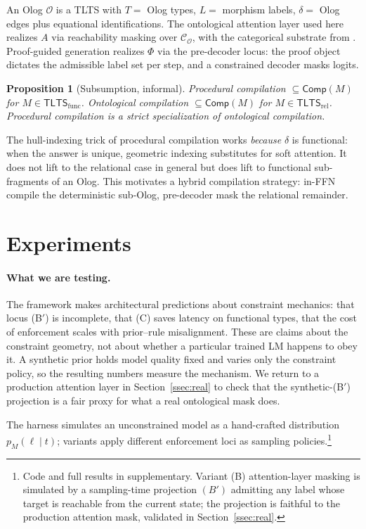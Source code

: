 \documentclass[preprint]{nesy2026}
\newtheorem{prop}{Proposition}
\begin{document}
An Olog $\mathcal{O}$ is a TLTS with $T = $ Olog types, $L = $
morphism labels, $\delta = $ Olog edges plus equational
identifications. The ontological attention layer used here
\citep{constrained_decoding} realizes $A$ via reachability masking
over $\mathcal{C}_\mathcal{O}$, with the categorical substrate from
\citet{spivakkent2012ologs}. Proof-guided generation
\citep{constrained_decoding} realizes $\Phi$ via the pre-decoder
locus: the proof object dictates the admissible label set per step,
and a constrained decoder masks logits.

\begin{prop}[Subsumption, informal]
Procedural compilation $\subseteq \mathsf{Comp}(M)$ for $M \in
\mathsf{TLTS}_{\mathrm{func}}$. Ontological compilation $\subseteq
\mathsf{Comp}(M)$ for $M \in \mathsf{TLTS}_{\mathrm{rel}}$.
Procedural compilation is a strict specialization of ontological
compilation.
\end{prop}

The hull-indexing trick of procedural compilation works \emph{because}
$\delta$ is functional: when the answer is unique, geometric indexing
substitutes for soft attention. It does not lift to the relational
case in general but does lift to functional sub-fragments of an
Olog. This motivates a hybrid compilation strategy: in-FFN compile
the deterministic sub-Olog, pre-decoder mask the relational
remainder.

\section{Experiments}
\label{sec:expts}

\paragraph{What we are testing.} The framework makes architectural
predictions about constraint mechanics: that locus (B$'$) is
incomplete, that (C) saves latency on functional types, that the
cost of enforcement scales with prior--rule misalignment. These are
claims about the constraint geometry, not about whether a particular
trained LM happens to obey it. A synthetic prior holds model quality
fixed and varies only the constraint policy, so the resulting
numbers measure the mechanism. We return to a production attention
layer in Section~\ref{ssec:real} to check that the
synthetic-(B$'$) projection is a fair proxy for what a real
ontological mask does.

The harness simulates an unconstrained model as a hand-crafted
distribution $p_M(\ell \mid t)$; variants apply different
enforcement loci as sampling policies.\footnote{Code and full results in supplementary.
Variant (B) attention-layer masking is simulated by a sampling-time
projection $(B')$ admitting any label whose target is reachable from
the current state; the projection is faithful to the production
attention mask, validated in Section~\ref{ssec:real}.}
\end{document}
